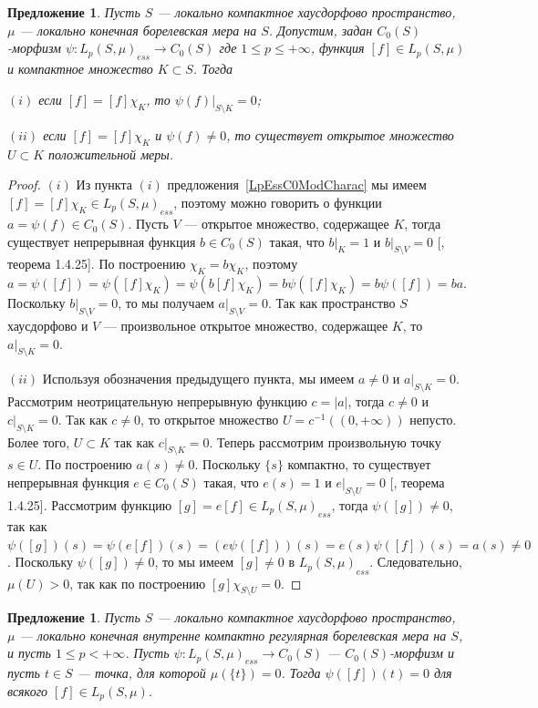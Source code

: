 \documentclass[12pt]{article}
\newtheorem{proposition}[theorem]{Предложение}
\begin{document}
\begin{proposition}\label{MorphLpEssC0Prop} Пусть $S$ --- локально компактное
    хаусдорфово пространство, $\mu$ --- локально конечная борелевская мера на
    $S$. Допустим, задан $C_0(S)$-морфизм $\psi:{L_p(S,\mu)}_{ess}\to C_0(S)$
    где $1\leq p\leq+\infty$, функция $[f]\in L_p(S,\mu)$ и компактное множество
    $K\subset S$. Тогда

    $(i)$ если $[f]=[f]\chi_K$, то $\psi(f)|_{S\setminus K}=0$;

    $(ii)$ если $[f]=[f]\chi_K$ и $\psi(f)\neq 0$, то существует открытое
    множество $U\subset K$ положительной меры.
\end{proposition}
\begin{proof} $(i)$ Из пункта $(i)$ предложения~\ref{LpEssC0ModCharac} мы имеем
    $[f]=[f]\chi_K\in {L_p(S,\mu)}_{ess}$, поэтому можно говорить о функции
    $a=\psi(f)\in C_0(S)$. Пусть $V$ --- открытое множество, содержащее $K$,
    тогда существует непрерывная функция $b\in C_0(S)$ такая, что $b|_K=1$ и
    $b|_{S\setminus V}=0$ [\cite{DalesBanSpContFunDualSp}, теорема 1.4.25]. По
    построению $\chi_K=b\chi_K$, поэтому
    $a=\psi([f])=\psi([f]\chi_K)=\psi(b[f]\chi_K)=b\psi([f]\chi_K)=b\psi([f])=ba$.
    Поскольку $b|_{S\setminus V}=0$, то мы получаем $a|_{S\setminus V}=0$. Так
    как пространство $S$ хаусдорфово и $V$ --- произвольное открытое множество,
    содержащее $K$, то $a|_{S\setminus K}=0$.

    $(ii)$ Используя обозначения предыдущего пункта, мы имеем $a\neq 0$ и
    $a|_{S\setminus K}=0$. Рассмотрим неотрицательную непрерывную функцию
    $c=|a|$, тогда $c\neq 0$ и $c|_{S\setminus K}=0$. Так как $c\neq 0$, то
    открытое множество $U=c^{-1}((0, +\infty))$ непусто. Более того, $U\subset
        K$ так как $c|_{S\setminus K}=0$. Теперь рассмотрим произвольную точку $s\in
        U$. По построению $a(s)\neq 0$. Поскольку $\{s\}$ компактно, то существует
    непрерывная функция $e\in C_0(S)$ такая, что $e(s)=1$ и $e|_{S\setminus
        U}=0$ [\cite{DalesBanSpContFunDualSp}, теорема 1.4.25]. Рассмотрим функцию
    $[g]=e[f]\in {L_p(S,\mu)}_{ess}$, тогда $\psi([g])\neq 0$, так как
    $\psi([g])(s)=\psi(e[f])(s)=(e\psi([f]))(s)=e(s)\psi([f])(s)=a(s)\neq 0$.
    Поскольку $\psi([g])\neq 0$, то мы имеем $[g]\neq 0$ в ${L_p(S,\mu)}_{ess}$.
    Следовательно, $\mu(U)>0$, так как по построению $[g]\chi_{S\setminus U}=0$.
\end{proof}

\begin{proposition}\label{MorphLpC0Prop}
    Пусть $S$ — локально компактное хаусдорфово пространство, $\mu$ — локально 
    конечная внутренне компактно регулярная борелевская мера на $S$, и 
    пусть $1\leq p<+\infty$. 
    Пусть $\psi: L_p(S,\mu)_{ess}\to C_0(S)$ --- $C_0(S)$-морфизм и 
    пусть $t\in S$ --- точка, для которой $\mu(\{t\})=0$. Тогда $\psi([f])(t)=0$ 
    для всякого $[f]\in L_p(S,\mu)$.
\end{proposition}
 
\end{document}
